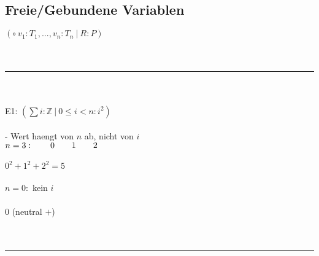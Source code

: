 \documentclass[18pt,a4paper]{article}
\newcommand{\tab}{\hspace*{2em}}
\begin{document}
\subsection{Freie/Gebundene Variablen}

$( \circ \: v_1 : T_1,...,v_n : T_n \:\vert\: R : P )$\\
\\
\\
\rule{\textwidth}{0.4mm}\\
\\
E1: \tab$(\sum{i} : \mathbb{Z} \:\vert\: 0\leqslant i < n : i^2 )$\\
\\
- Wert haengt von $n$ ab, nicht von $i$\\
\tab $n = 3: \tab0\tab1\tab2$\\
\\
\tab\tab\tab $0^2 + 1^2 + 2^2 = 5$\\
\\
\tab $n = 0:$ kein $i$\\
\\
\tab\tab $0$ (neutral $+$)\\
\\
\\
\rule{\textwidth}{0.4mm}\\
\\
\end{document}

